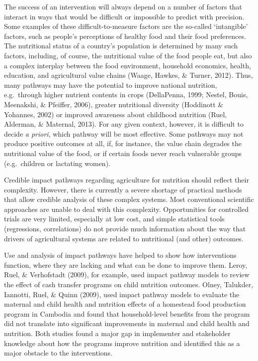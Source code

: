 \documentclass[
]{article}
\begin{document}
The success of an intervention will always depend on a number of factors
that interact in ways that would be difficult or impossible to predict
with precision. Some examples of these difficult-to-measure factors are
the so-called `intangible' factors, such as people's perceptions of
healthy food and their food preferences. The nutritional status of a
country's population is determined by many such factors, including, of
course, the nutritional value of the food people eat, but also a complex
interplay between the food environment, household economics, health,
education, and agricultural value chains (Waage, Hawkes, \& Turner,
2012). Thus, many pathways may have the potential to improve national
nutrition, e.g.~through higher nutrient contents in crops (DellaPenna,
1999; Nestel, Bouis, Meenakshi, \& Pfeiffer, 2006), greater nutritional
diversity (Hoddinott \& Yohannes, 2002) or improved awareness about
childhood nutrition (Ruel, Alderman, \& Maternal, 2013). For any given
context, however, it is difficult to decide \emph{a priori}, which
pathway will be most effective. Some pathways may not produce positive
outcomes at all, if, for instance, the value chain degrades the
nutritional value of the food, or if certain foods never reach
vulnerable groups (e.g.~children or lactating women).

Credible impact pathways regarding agriculture for nutrition should
reflect their complexity. However, there is currently a severe shortage
of practical methods that allow credible analysis of these complex
systems. Most conventional scientific approaches are unable to deal with
this complexity. Opportunities for controlled trials are very limited,
especially at low cost, and simple statistical tools (regressions,
correlations) do not provide much information about the way that drivers
of agricultural systems are related to nutritional (and other) outcomes.

Use and analysis of impact pathways have helped to show how
interventions function, where they are lacking and what can be done to
improve them. Leroy, Ruel, \& Verhofstadt (2009), for example, used
impact pathway models to review the effect of cash transfer programs on
child nutrition outcomes. Olney, Talukder, Iannotti, Ruel, \& Quinn
(2009), used impact pathway models to evaluate the maternal and child
health and nutrition effects of a homestead food production program in
Cambodia and found that household-level benefits from the program did
not translate into significant improvements in maternal and child health
and nutrition. Both studies found a major gap in implementer and
stakeholder knowledge about how the programs improve nutrition and
identified this as a major obstacle to the interventions.
\end{document}
